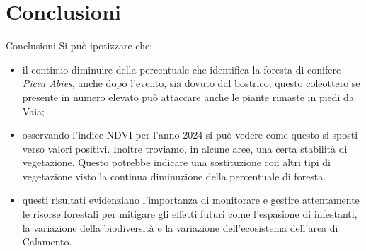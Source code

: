 \documentclass[10pt]{beamer}
\begin{document}
\section{Conclusioni}
\begin{frame}{Conclusioni}
Si può ipotizzare che: 
\begin{itemize}
    \item il continuo diminuire della percentuale che identifica la foresta di conifere \textit{Picea Abies}, anche dopo l'evento, sia dovuto dal bostrico; questo coleottero se presente in numero elevato può attaccare anche le piante rimaste in piedi da Vaia; 
     \item osservando l'indice NDVI per l'anno 2024 si può vedere come questo si sposti verso valori positivi. Inoltre troviamo, in alcune aree, una certa stabilità di vegetazione. Questo potrebbe indicare una sostituzione con altri tipi di vegetazione visto la continua diminuzione della percentuale di foresta.
     \item questi risultati evidenziano l'importanza di monitorare e gestire attentamente le risorse forestali per mitigare gli effetti futuri come l'espasione di infestanti, la variazione della biodiversità e la variazione dell'ecosistema dell'area di Calamento. 
\end{itemize} 
\end{frame}
\end{document}
